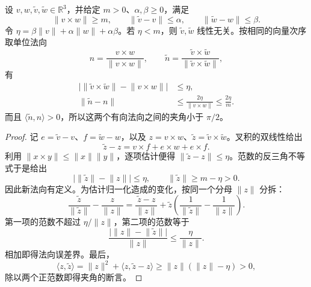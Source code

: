 \begin{proposition}\label{g1:prop:cross-product-normal-stability}
	设 \(v,w,\widetilde v,\widetilde w\in\mathbb R^3\)，并给定 \(m>0\)、\(\alpha,\beta\ge0\)，满足
	\[
		\lVert v\times w\rVert\ge m,\qquad
		\lVert\widetilde v-v\rVert\le\alpha,\qquad
		\lVert\widetilde w-w\rVert\le\beta.
	\]
	令 \(\eta=\beta\lVert v\rVert+\alpha\lVert w\rVert+\alpha\beta\)。若 \(\eta<m\)，则 \(\widetilde v,\widetilde w\) 线性无关。按相同的向量次序取单位法向
	\[
		n=\frac{v\times w}{\lVert v\times w\rVert},\qquad
		\widetilde n=\frac{\widetilde v\times\widetilde w}{\lVert\widetilde v\times\widetilde w\rVert},
	\]
	有
	\begin{equation}\label{g1:eq:cross-product-normal-error}
		\begin{aligned}
			\bigl|\lVert\widetilde v\times\widetilde w\rVert-\lVert v\times w\rVert\bigr|&\le\eta,\\
			\lVert\widetilde n-n\rVert&\le\frac{2\eta}{\lVert v\times w\rVert}\le\frac{2\eta}{m}.
		\end{aligned}
	\end{equation}
	而且 \(\langle\widetilde n,n\rangle>0\)，所以这两个有向法向之间的夹角小于 \(\pi/2\)。
\end{proposition}
\begin{proof}
	记 \(e=\widetilde v-v\)、\(f=\widetilde w-w\)，以及 \(z=v\times w\)、\(\widetilde z=\widetilde v\times\widetilde w\)。叉积的双线性给出
	\[
		\widetilde z-z=v\times f+e\times w+e\times f.
	\]
	利用 \(\lVert x\times y\rVert\le\lVert x\rVert\lVert y\rVert\)，逐项估计便得 \(\lVert\widetilde z-z\rVert\le\eta\)。范数的反三角不等式于是给出
	\[
		\bigl|\lVert\widetilde z\rVert-\lVert z\rVert\bigr|\le\eta,
		\qquad\lVert\widetilde z\rVert\ge m-\eta>0.
	\]
	因此新法向有定义。为估计归一化造成的变化，按同一个分母 \(\lVert z\rVert\) 分拆：
	\[
		\frac{\widetilde z}{\lVert\widetilde z\rVert}-\frac z{\lVert z\rVert}
		=\frac{\widetilde z-z}{\lVert z\rVert}
		+\widetilde z\left(\frac1{\lVert\widetilde z\rVert}-\frac1{\lVert z\rVert}\right).
	\]
	第一项的范数不超过 \(\eta/\lVert z\rVert\)，第二项的范数等于
	\[
		\frac{\bigl|\lVert z\rVert-\lVert\widetilde z\rVert\bigr|}{\lVert z\rVert}
		\le\frac\eta{\lVert z\rVert}.
	\]
	相加即得法向误差界。最后，
	\[
		\langle z,\widetilde z\rangle
		=\lVert z\rVert^2+\langle z,\widetilde z-z\rangle
		\ge\lVert z\rVert(\lVert z\rVert-\eta)>0,
	\]
	除以两个正范数即得夹角的断言。
\end{proof}

